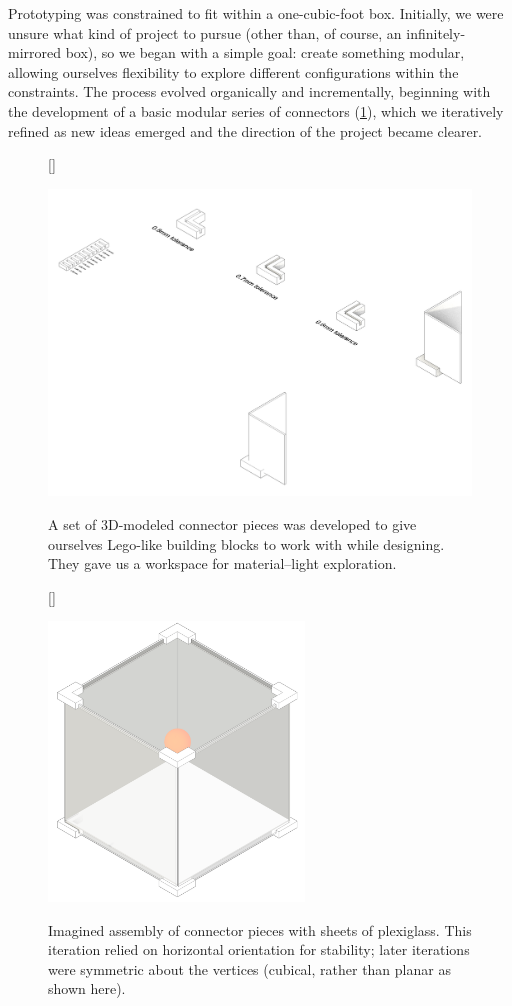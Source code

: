 \documentclass[12pt]{article}
\begin{document}
    Prototyping was constrained to fit within a one-cubic-foot box. Initially, we were unsure what kind of project to pursue (other than, of course, an infinitely-mirrored box), so we began with a simple goal: create something modular, allowing ourselves flexibility to explore different configurations within the constraints. The process evolved organically and incrementally, beginning with the development of a basic modular series of connectors (\cref{fig:connectors}), which we iteratively refined as new ideas emerged and the direction of the project became clearer.

    \begin{figure}[h]
        [\FBwidth]
        {\caption{A set of 3D-modeled connector pieces was developed to give ourselves Lego-like building blocks to work with while designing. They gave us a workspace for material–light exploration.}\label{fig:connectors}}
        {\includegraphics[width=12cm]{images/connectors.png}}
    \end{figure}

    \begin{figure}[h]
        [\FBwidth]
        {\caption{Imagined assembly of connector pieces with sheets of plexiglass. This iteration relied on horizontal orientation for stability; later iterations were symmetric about the vertices (cubical, rather than planar as shown here).}\label{fig:assembled}}
        {\includegraphics[width=6.8cm]{images/assembled.png}}
    \end{figure}
\end{document}
